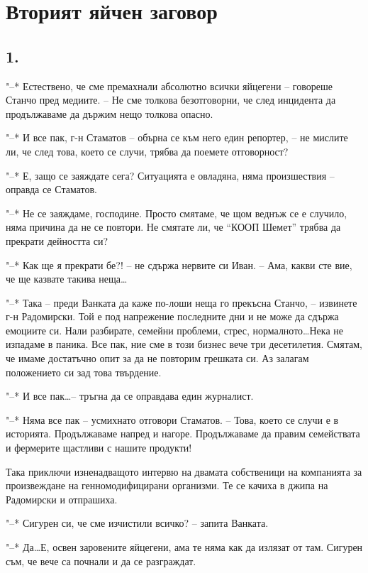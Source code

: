 \documentclass[ebook,openany,12pt]{memoir}
\begin{document}
\chapter{Вторият яйчен заговор}

\section*{1.}

"--* Естествено, че сме премахнали абсолютно всички яйцегени – говореше Станчо пред медиите. – Не сме толкова безотговорни, че след инцидента да продължаваме да държим нещо толкова опасно.

"--* И все пак, г-н Стаматов -- обърна се към него един репортер, – не мислите ли, че след това, което се случи, трябва да поемете отговорност?

"--* Е, защо се заяждате сега? Ситуацията е овладяна, няма произшествия – оправда се Стаматов.

"--* Не се заяждаме, господине. Просто смятаме, че щом веднъж се е случило, няма причина да не се повтори. Не смятате ли, че ``КООП Шемет'' трябва да прекрати дейността си?

"--* Как ще я прекрати бе?! – не сдържа нервите си Иван. – Ама, какви сте вие, че ще казвате такива неща\ldots

"--* Така -- преди Ванката да каже по-лоши неща го прекъсна Станчо, – извинете г-н Радомирски. Той е под напрежение последните дни и не може да сдържа емоциите си. Нали разбирате, семейни проблеми, стрес, нормалното\ldots Нека не изпадаме в паника. Все пак, ние сме в този бизнес вече три десетилетия. Смятам, че имаме достатъчно опит за да не повторим грешката си. Аз залагам положението си зад това твърдение.

"--* И все пак\ldots – тръгна да се оправдава един журналист.

"--* Няма все пак – усмихнато отговори Стаматов. – Това, което се случи е в историята. Продължаваме напред и нагоре. Продължаваме да правим семействата и фермерите щастливи с нашите продукти!

Така приключи изненадващото интервю на двамата собственици на компанията за произвеждане на генномодифицирани организми. Те се качиха в джипа на Радомирски и отпрашиха.

"--* Сигурен си, че сме изчистили всичко? – запита Ванката.

"--* Да\ldots Е, освен заровените яйцегени, ама те няма как да излязат от там. Сигурен съм, че вече са почнали и да се разграждат.
\end{document}
